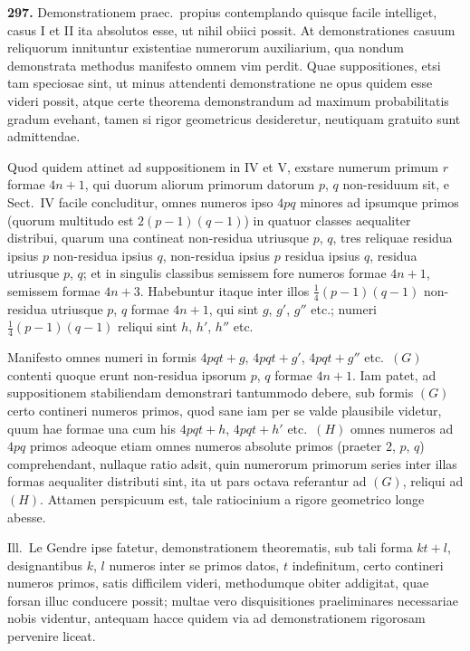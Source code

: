 \documentclass[12pt,a4paper]{article}
\theoremstyle{plain}
\theoremstyle{definition}
\theoremstyle{remark}
\begin{document}
\textbf{297.} Demonstrationem praec.~propius contemplando quisque facile intelliget, casus I et II ita absolutos esse, ut nihil obiici possit. At demonstrationes casuum reliquorum innituntur existentiae numerorum auxiliarium, qua nondum demonstrata methodus manifesto omnem vim perdit. Quae suppositiones, etsi tam speciosae sint, ut minus attendenti demonstratione ne opus quidem esse videri possit, atque certe theorema demonstrandum ad maximum probabilitatis gradum evehant, tamen si rigor geometricus desideretur, neutiquam gratuito sunt admittendae.

Quod quidem attinet ad suppositionem in IV et V, exstare numerum primum $r$ formae $4n+1$, qui duorum aliorum primorum datorum $p$, $q$ non-residuum sit, e Sect.~IV facile concluditur, omnes numeros ipso $4pq$ minores ad ipsumque primos (quorum multitudo est $2(p-1)(q-1)$) in quatuor classes aequaliter distribui, quarum una contineat non-residua utriusque $p$, $q$, tres reliquae residua ipsius $p$ non-residua ipsius $q$, non-residua ipsius $p$ residua ipsius $q$, residua utriusque $p$, $q$; et in singulis classibus semissem fore numeros formae $4n+1$, semissem formae $4n+3$. Habebuntur itaque inter illos $\tfrac{1}{4}(p-1)(q-1)$ non-residua utriusque $p$, $q$ formae $4n+1$, qui sint $g$, $g'$, $g''$ etc.; numeri $\tfrac{1}{4}(p-1)(q-1)$ reliqui sint $h$, $h'$, $h''$ etc.

Manifesto omnes numeri in formis $4pqt + g$, $4pqt + g'$, $4pqt + g''$ etc.~$(G)$ contenti quoque erunt non-residua ipsorum $p$, $q$ formae $4n+1$. Iam patet, ad suppositionem stabiliendam demonstrari tantummodo debere, sub formis $(G)$ certo contineri numeros primos, quod sane iam per se valde plausibile videtur, quum hae formae una cum his $4pqt + h$, $4pqt + h'$ etc.~$(H)$ omnes numeros ad $4pq$ primos adeoque etiam omnes numeros absolute primos (praeter $2$, $p$, $q$) comprehendant, nullaque ratio adsit, quin numerorum primorum series inter illas formas aequaliter distributi sint, ita ut pars octava referantur ad $(G)$, reliqui ad $(H)$. Attamen perspicuum est, tale ratiocinium a rigore geometrico longe abesse.

Ill.~Le Gendre ipse fatetur, demonstrationem theorematis, sub tali forma $kt + l$, designantibus $k$, $l$ numeros inter se primos datos, $t$ indefinitum, certo contineri numeros primos, satis difficilem videri, methodumque obiter addigitat, quae forsan illuc conducere possit; multae vero disquisitiones praeliminares necessariae nobis videntur, antequam hacce quidem via ad demonstrationem rigorosam pervenire liceat.
\end{document}
